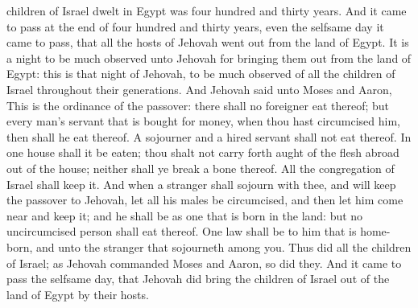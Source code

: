 children of Israel dwelt in Egypt was four hundred and thirty years. And it came to pass at the end of four hundred and thirty years, even the selfsame day it came to pass, that all the hosts of Jehovah went out from the land of Egypt. It is a night to be much observed unto Jehovah for bringing them out from the land of Egypt: this is that night of Jehovah, to be much observed of all the children of Israel throughout their generations.  And Jehovah said unto Moses and Aaron, This is the ordinance of the passover: there shall no foreigner eat thereof; but every man’s servant that is bought for money, when thou hast circumcised him, then shall he eat thereof. A sojourner and a hired servant shall not eat thereof. In one house shall it be eaten; thou shalt not carry forth aught of the flesh abroad out of the house; neither shall ye break a bone thereof. All the congregation of Israel shall keep it. And when a stranger shall sojourn with thee, and will keep the passover to Jehovah, let all his males be circumcised, and then let him come near and keep it; and he shall be as one that is born in the land: but no uncircumcised person shall eat thereof. One law shall be to him that is home-born, and unto the stranger that sojourneth among you. Thus did all the children of Israel; as Jehovah commanded Moses and Aaron, so did they. And it came to pass the selfsame day, that Jehovah did bring the children of Israel out of the land of Egypt by their hosts. 

